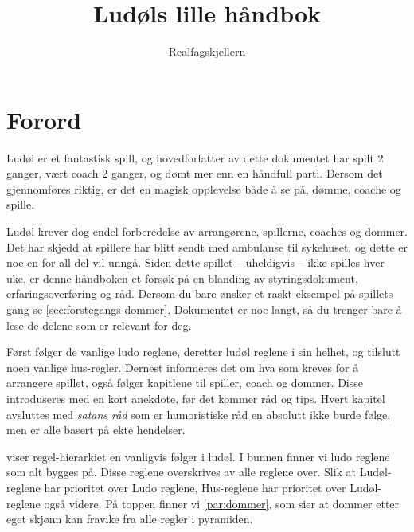 \documentclass[10pt,a4paper,norsk,openany]{book}
\author{Realfagskjellern}
\title{Ludøls lille håndbok}
\begin{document}
\frontmatter

\maketitle

\section*{Forord}

Ludøl er et fantastisk spill, og hovedforfatter av dette dokumentet har spilt 2
ganger, vært coach 2 ganger, og dømt mer enn en håndfull parti. Dersom det
gjennomføres riktig, er det en magisk opplevelse både å se på, dømme, coache
og spille.  

Ludøl krever dog endel forberedelse av arrangørene, spillerne, coaches og
dommer. Det har skjedd at spillere har blitt sendt med ambulanse til sykehuset,
og dette er noe en for all del vil unngå. Siden dette spillet -- uheldigvis --
ikke spilles hver uke, er denne håndboken et forsøk på en blanding av
styringsdokument, erfaringsoverføring og råd. Dersom du bare ønsker et raskt
eksempel på spillets gang se \cref{sec:forstegangs-dommer}. Dokumentet er noe
langt, så du trenger bare å lese de delene som er relevant for deg.

Først følger de vanlige ludo reglene, deretter ludøl reglene i sin helhet, og
tilslutt noen vanlige hus-regler. Dernest informeres det om hva som kreves for
å arrangere spillet, også følger kapitlene til spiller, coach og dommer. Disse
introduseres med en kort anekdote, før det kommer råd og tips. Hvert kapitel
avsluttes med \emph{satans råd} som er humoristiske råd en absolutt ikke burde
følge, men er alle basert på ekte hendelser.

 viser regel-hierarkiet en vanligvis følger i ludøl. I
bunnen finner vi ludo reglene som alt bygges på. Disse reglene overskrives av
alle reglene over. Slik at Ludøl-reglene har prioritet over Ludo reglene,
Hus-reglene har prioritet over Ludøl-reglene også videre. På toppen finner vi
\cref{par:dommer}, som sier at dommer etter eget skjønn kan fravike fra alle
regler i pyramiden.

\begin{figure}[htbp!]
  \centering
  
  \caption{}
  \label{fig:maslows-ludol}
\end{figure}

\tableofcontents

\mainmatter
\end{document}

